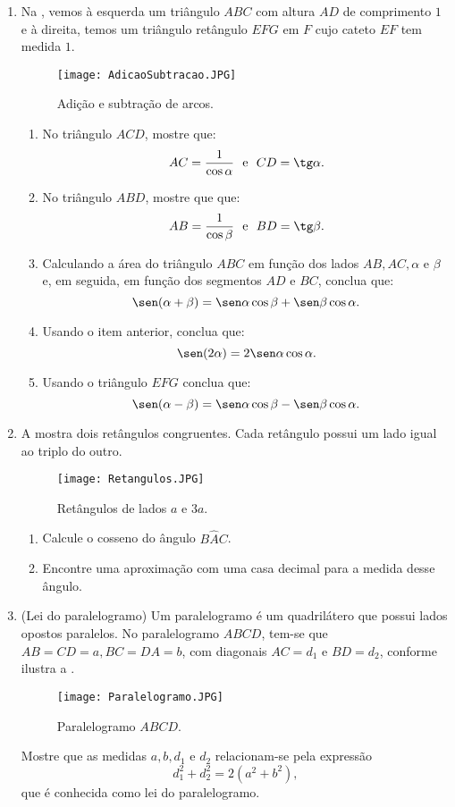 \begin{enumerate}
\item{}
Na , vemos à esquerda um triângulo $ABC$ com altura $AD$ de comprimento $1$ e à direita, temos um triângulo retângulo $EFG$ em $F$ cujo cateto $EF$ tem medida $1$.
\begin{figure}[H]
    \centering
    \texttt{[image: AdicaoSubtracao.JPG]}
    \caption{Adição e subtração de arcos.}
    \label{AdicaoSubtracao}
\end{figure}
\begin{enumerate}
     \item No triângulo $ACD$, mostre que: 
     $$AC=\frac{1}{\cos\alpha} \ \ \text{e} \ \  CD=\tg\alpha.$$
     \item No triângulo $ABD$, mostre que que: 
     $$AB=\frac{1}{\cos\beta} \ \ \text{e} \ \  BD=\tg\beta.$$
    \item Calculando a área do triângulo $ABC$ em função dos lados $AB, AC, \alpha$ e $\beta$ e, em seguida, em função dos segmentos $AD$ e $BC$, conclua que:
    $$\sen(\alpha+\beta)=\sen\alpha\cos\beta+\sen\beta\cos\alpha.$$
    \item Usando o item anterior, conclua que: 
    $$\sen(2\alpha)=2\sen\alpha\cos\alpha.$$
    \item Usando o triângulo $EFG$ conclua que: 
    $$\sen(\alpha-\beta)=\sen\alpha\cos\beta-\sen\beta\cos\alpha.$$
\end{enumerate}

\item{}
A  mostra dois retângulos congruentes. Cada retângulo possui um lado igual ao triplo do outro.
\begin{figure}[H]
    \centering
    \texttt{[image: Retangulos.JPG]}
    \caption{Retângulos de lados $a$ e $3a$.}
    \label{Retangulos}
\end{figure}
\begin{enumerate}
    \item Calcule o cosseno do ângulo $B\hat{A}C$.
    \item Encontre uma aproximação com uma casa decimal para a medida desse ângulo.
\end{enumerate}

\item{}
(Lei do paralelogramo) Um paralelogramo é um quadrilátero que possui lados opostos paralelos. No paralelogramo $ABCD$, tem-se que $AB=CD=a,BC=DA=b$, com  diagonais $AC=d_1$ e $BD=d_2$, conforme ilustra a . 
\begin{figure}[H]
    \centering
    \texttt{[image: Paralelogramo.JPG]}
    \caption{Paralelogramo $ABCD$.}
    \label{Parelelogramo}
\end{figure}
Mostre que as medidas $a,b, d_1$ e $d_2$ relacionam-se pela expressão
$$d_1^2+d_2^2=2(a^2+b^2),$$
que é conhecida como lei do paralelogramo.


\end{enumerate}
